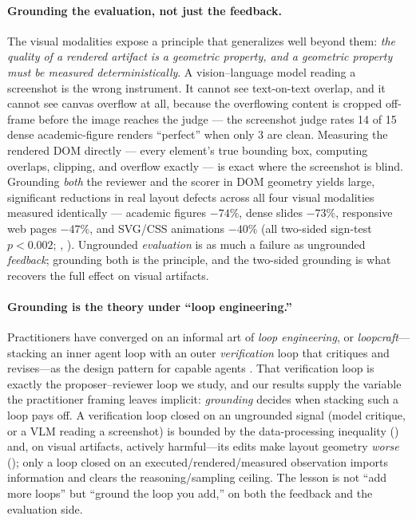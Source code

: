 \paragraph{Grounding the evaluation, not just the feedback.} The visual modalities expose a principle that generalizes well beyond them: \emph{the quality of a rendered artifact is a geometric property, and a geometric property must be measured deterministically}. A vision--language model reading a screenshot is the wrong instrument. It cannot see text-on-text overlap, and it cannot see canvas overflow at all, because the overflowing content is cropped off-frame before the image reaches the judge --- the screenshot judge rates 14 of 15 dense academic-figure renders ``perfect'' when only 3 are clean. Measuring the rendered DOM directly --- every element's true bounding box, computing overlaps, clipping, and overflow exactly --- is exact where the screenshot is blind. Grounding \emph{both} the reviewer and the scorer in DOM geometry yields large, significant reductions in real layout defects across all four visual modalities measured identically --- academic figures $-74\%$, dense slides $-73\%$, responsive web pages $-47\%$, and SVG/CSS animations $-40\%$ (all two-sided sign-test $p<0.002$; , ). Ungrounded \emph{evaluation} is as much a failure as ungrounded \emph{feedback}; grounding both is the principle, and the two-sided grounding is what recovers the full effect on visual artifacts.

\paragraph{Grounding is the theory under ``loop engineering.''} Practitioners have converged on an informal art of \emph{loop engineering}, or \emph{loopcraft}---stacking an inner agent loop with an outer \emph{verification} loop that critiques and revises---as the design pattern for capable agents \citep{swyx2026loopcraft,langchain2026loopeng}. That verification loop is exactly the proposer--reviewer loop we study, and our results supply the variable the practitioner framing leaves implicit: \emph{grounding} decides when stacking such a loop pays off. A verification loop closed on an ungrounded signal (model critique, or a VLM reading a screenshot) is bounded by the data-processing inequality () and, on visual artifacts, actively harmful---its edits make layout geometry \emph{worse} (); only a loop closed on an executed/rendered/measured observation imports information and clears the reasoning/sampling ceiling. The lesson is not ``add more loops'' but ``ground the loop you add,'' on both the feedback and the evaluation side.


